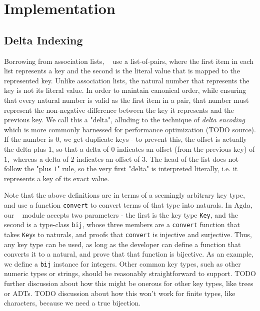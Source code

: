 \section{Implementation}
\label{sec:DD}

\subsection{Delta Indexing}

Borrowing from association lists, \dds~ use a list-of-pairs, where the first item in each list represents
a key and the second is the literal value that is mapped to the represented key. Unlike association lists,
the natural number that represents the key is not its literal value. In order to maintain canonical order,
while ensuring that every natural number is valid as the first item in a pair, that number must represent
the non-negative difference between the key it represents and the previous key. We call this a "delta",
alluding to the technique of \emph{delta encoding} which is more commonly harnessed for performance
optimization (TODO source). If the number is $0$, we get duplicate keys - to prevent this, the offset is
actually the delta plus $1$, so that a delta of $0$ indicates an offset (from the previous key) of $1$,\
whereas a delta of $2$ indicates an offset of $3$. The head of the list does not follow the "plus $1$"
rule, so the very first "delta" is interpreted literally, i.e. it represents a key of its exact
value.







Note that the above definitions are in terms of a seemingly arbitrary key type,
and use a function \texttt{convert} to convert terms of that type into naturals.
In Agda, our \dd~ module accepts two parameters - the first is the key type \texttt{Key},
and the second is a type-class \texttt{bij}, whose three members are a \texttt{convert}
function that takes \texttt{Key}s to naturals, and proofs that \texttt{convert} is
injective and surjective. Thus, any key type can be used, as long as the developer
can define a function that converts it to a natural, and prove that that function is
bijective. As an example, we define a \texttt{bij} instance for integers. Other common
key types, such as other numeric types or strings, should be reasonably straightforward
to support. TODO further discussion about how this might be onerous for other key types,
like trees or ADTs. TODO discussion about how this won't work for finite types, like
characters, because we need a true bijection.


